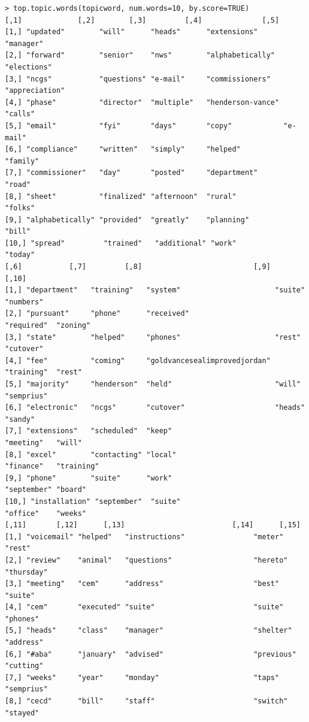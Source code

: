 \documentclass[a4paper]{article}
\begin{document}
\clearpage 
\normalsize
\begin{verbatim}
> top.topic.words(topicword, num.words=10, by.score=TRUE)
[,1]             [,2]        [,3]         [,4]              [,5]          
[1,] "updated"        "will"      "heads"      "extensions"      "manager"     
[2,] "forward"        "senior"    "nws"        "alphabetically"  "elections"   
[3,] "ncgs"           "questions" "e-mail"     "commissioners"   "appreciation"
[4,] "phase"          "director"  "multiple"   "henderson-vance" "calls"       
[5,] "email"          "fyi"       "days"       "copy"            "e-mail"      
[6,] "compliance"     "written"   "simply"     "helped"          "family"      
[7,] "commissioner"   "day"       "posted"     "department"      "road"        
[8,] "sheet"          "finalized" "afternoon"  "rural"           "folks"       
[9,] "alphabetically" "provided"  "greatly"    "planning"        "bill"        
[10,] "spread"         "trained"   "additional" "work"            "today"       
[,6]           [,7]         [,8]                          [,9]        [,10]     
[1,] "department"   "training"   "system"                      "suite"     "numbers" 
[2,] "pursuant"     "phone"      "received"                    "required"  "zoning"  
[3,] "state"        "helped"     "phones"                      "rest"      "cutover" 
[4,] "fee"          "coming"     "goldvancesealimprovedjordan" "training"  "rest"    
[5,] "majority"     "henderson"  "held"                        "will"      "semprius"
[6,] "electronic"   "ncgs"       "cutover"                     "heads"     "sandy"   
[7,] "extensions"   "scheduled"  "keep"                        "meeting"   "will"    
[8,] "excel"        "contacting" "local"                       "finance"   "training"
[9,] "phone"        "suite"      "work"                        "september" "board"   
[10,] "installation" "september"  "suite"                       "office"    "weeks"   
[,11]       [,12]      [,13]                         [,14]      [,15]     
[1,] "voicemail" "helped"   "instructions"                "meter"    "rest"    
[2,] "review"    "animal"   "questions"                   "hereto"   "thursday"
[3,] "meeting"   "cem"      "address"                     "best"     "suite"   
[4,] "cem"       "executed" "suite"                       "suite"    "phones"  
[5,] "heads"     "class"    "manager"                     "shelter"  "address" 
[6,] "#aba"      "january"  "advised"                     "previous" "cutting" 
[7,] "weeks"     "year"     "monday"                      "taps"     "semprius"
[8,] "cecd"      "bill"     "staff"                       "switch"   "stayed"  

\end{verbatim}
\end{document}
